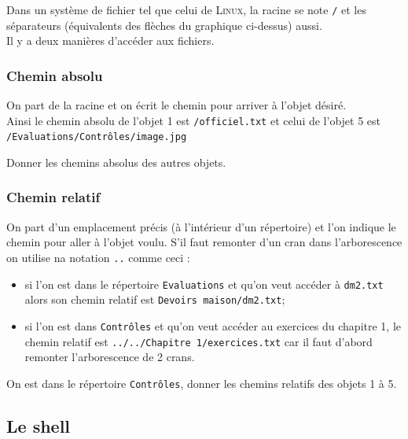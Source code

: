 	Dans un système de fichier tel que celui de \textsc{Linux}, la racine se note \texttt{/} et les séparateurs (équivalents des flèches du graphique ci-dessus) aussi.\\
	Il y a deux manières d'accéder aux fichiers.

	\subsubsection{Chemin absolu}
	On part de la racine et on écrit le chemin pour arriver à l'objet désiré.\\
	Ainsi le chemin absolu de l'objet 1 est \texttt{/officiel.txt} et celui de l'objet 5 est\\ \texttt{/Evaluations/Contrôles/image.jpg}
	
	\begin{exercice}[]
		Donner les chemins absolus des autres objets.
	\end{exercice}

	

	\subsubsection{Chemin relatif}
	On part d'un emplacement précis (à l'intérieur d'un répertoire) et l'on indique le chemin pour aller à l'objet voulu. S'il faut remonter d'un cran dans l'arborescence on utilise na notation \texttt{..} comme ceci :
	\begin{itemize}
		\item 	si l'on est dans le répertoire \texttt{Evaluations} et qu'on veut accéder à \texttt{dm2.txt} alors son chemin relatif est \texttt{Devoirs maison/dm2.txt};
		\item 	si l'on est dans \texttt{Contrôles} et qu'on veut accéder au exercices du chapitre 1, le chemin relatif est \texttt{../../Chapitre 1/exercices.txt} car il faut d'abord remonter l'arborescence de 2 crans.
	\end{itemize}

	\begin{exercice}[]
		On est dans le répertoire \texttt{Contrôles}, donner les chemins relatifs des objets 1 à 5.
	\end{exercice}
	
	\subsection{Le shell}
	
